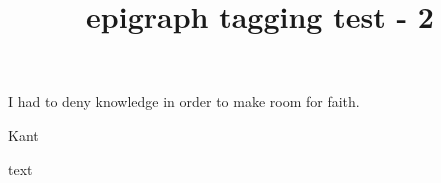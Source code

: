 \documentclass{article}
\title{epigraph tagging test - 2}
\begin{document}
\epigraph{I had to deny knowledge in order to make room for faith.}{Kant}

text
\end{document}
